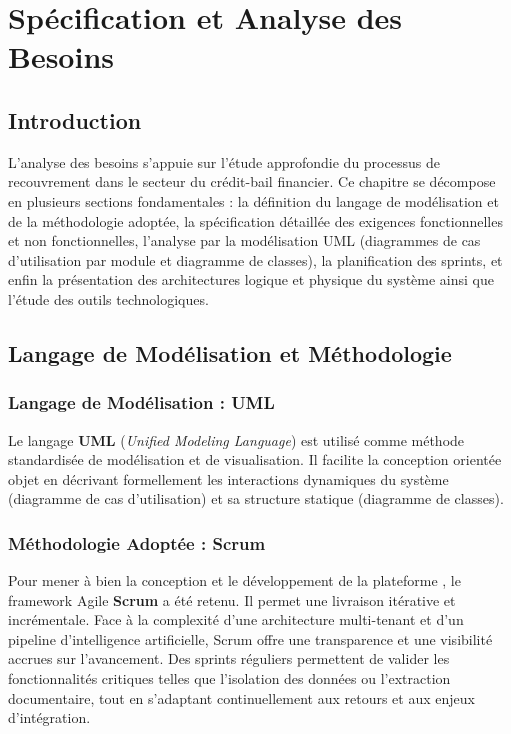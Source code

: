 
\chapter{Spécification et Analyse des Besoins}
\label{chap:besoins}

\section{Introduction}

L'analyse des besoins s'appuie sur l'étude approfondie du processus de recouvrement dans le secteur du crédit-bail financier. Ce chapitre se décompose en plusieurs sections fondamentales : la définition du langage de modélisation et de la méthodologie adoptée, la spécification détaillée des exigences fonctionnelles et non fonctionnelles, l'analyse par la modélisation UML (diagrammes de cas d'utilisation par module et diagramme de classes), la planification des sprints, et enfin la présentation des architectures logique et physique du système ainsi que l'étude des outils technologiques.

\section{Langage de Modélisation et Méthodologie}

\subsection{Langage de Modélisation : UML}

Le langage \textbf{UML} (\textit{Unified Modeling Language}) est utilisé comme méthode standardisée de modélisation et de visualisation. Il facilite la conception orientée objet en décrivant formellement les interactions dynamiques du système (diagramme de cas d'utilisation) et sa structure statique (diagramme de classes).

\subsection{Méthodologie Adoptée : Scrum}

Pour mener à bien la conception et le développement de la plateforme \projectShortTitle, le framework Agile \textbf{Scrum} a été retenu. Il permet une livraison itérative et incrémentale. Face à la complexité d'une architecture multi-tenant et d'un pipeline d'intelligence artificielle, Scrum offre une transparence et une visibilité accrues sur l'avancement. Des sprints réguliers permettent de valider les fonctionnalités critiques telles que l'isolation des données ou l'extraction documentaire, tout en s'adaptant continuellement aux retours et aux enjeux d'intégration.

